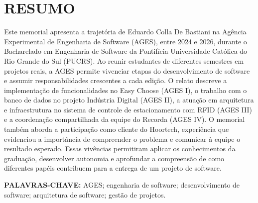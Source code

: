 \chapter*{RESUMO}
Este memorial apresenta a trajetória de Eduardo Colla De Bastiani na Agência Experimental de Engenharia de Software (AGES), entre 2024 e 2026, durante o Bacharelado em Engenharia de Software da Pontifícia Universidade Católica do Rio Grande do Sul (PUCRS). Ao reunir estudantes de diferentes semestres em projetos reais, a AGES permite vivenciar etapas do desenvolvimento de software e assumir responsabilidades crescentes a cada edição. O relato descreve a implementação de funcionalidades no Easy Choose (AGES I), o trabalho com o banco de dados no projeto Indústria Digital (AGES II), a atuação em arquitetura e infraestrutura no sistema de controle de estacionamento com RFID (AGES III) e a coordenação compartilhada da equipe do Recorda (AGES IV). O memorial também aborda a participação como cliente do Hoortech, experiência que evidenciou a importância de compreender o problema e comunicar à equipe o resultado esperado. Essas vivências permitiram aplicar os conhecimentos da graduação, desenvolver autonomia e aprofundar a compreensão de como diferentes papéis contribuem para a entrega de um projeto de software.
\par
\medskip
\noindent\textbf{PALAVRAS-CHAVE:} AGES; engenharia de software; desenvolvimento de software; arquitetura de software; gestão de projetos.\par
\clearpage
\listoffigures*

\clearpage
